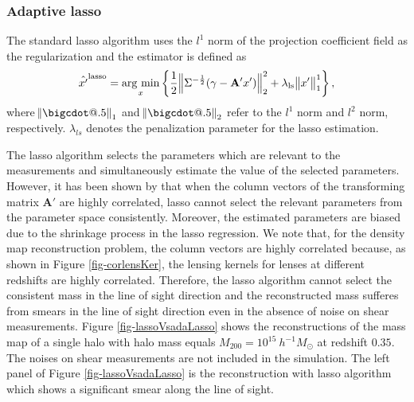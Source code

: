 \documentclass[twocolumn]{aastex62}
\makeatletter
\newcommand*\bigcdot{\mathpalette\bigcdot@{.5}}
\newcommand*\bigcdot@[2]{\mathbin{\vcenter{\hbox{\scalebox{#2}{$\m@th#1\bullet$}}}}}
\newcommand{\argmin}{\mathop{\rm arg~min}\limits}
\makeatother
\begin{document}
\subsubsection{Adaptive lasso}

The standard lasso algorithm uses the $l^1$ norm of the projection coefficient field as the regularization and the estimator is 
defined as
\begin{equation}
\hat{x'}^{\rm{lasso}}=\argmin_{x} \left\{ \frac{1}{2}\norm{\Sigma^{-\frac{1}{2}}(\gamma- \mathbf{A'} x')}_2^2+ \lambda_{\rm{ls}} \norm{x'}^1_1\right\},
\end{equation}
where $\norm{\bigcdot}_1$ and $\norm{\bigcdot}_2$ refer to the $l^1$ norm and $l^2$ norm, respectively.
$\lambda_{ls}$ denotes the penalization parameter for the lasso estimation.

The lasso algorithm selects the parameters which are relevant to the measurements and simultaneously estimate the value of
the selected parameters. However, it has been shown by
\citet{AdaLASSO-Zou2006} that when the column vectors of the transforming matrix $\mathbf{A'}$ are highly correlated,
lasso cannot select the relevant parameters from the parameter space consistently. Moreover, the estimated parameters
are biased due to the shrinkage process in the lasso regression. We note that, for the density map reconstruction problem,
the column vectors are highly correlated because, as shown in Figure \ref{fig-corlensKer}, the lensing kernels for
lenses at different redshifts are highly correlated. Therefore, the lasso algorithm cannot select the consistent mass in
the line of sight direction and the reconstructed mass sufferes from smears in the line of sight direction even in the
absence of noise on shear measurements.
Figure \ref{fig-lassoVsadaLasso} shows the reconstructions of the mass map of a single halo with halo mass equals
$M_{200}=10^{15} ~h^{-1}M_{\odot}$ at redshift $0.35$. The noises on shear measurements are not included in the simulation. 
The left panel of Figure \ref{fig-lassoVsadaLasso} is the reconstruction with lasso algorithm which shows a significant smear 
along the line of sight.
\end{document}
